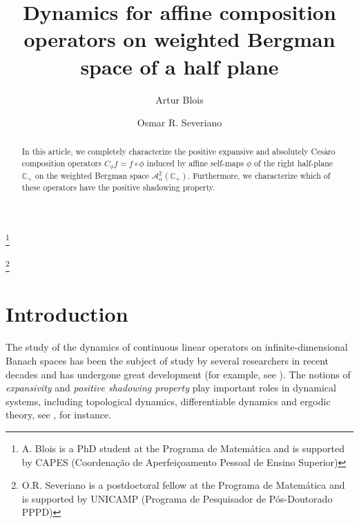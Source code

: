 \documentclass[11pt]{amsart}%
\numberwithin{equation}{section}
\theoremstyle{plain}
\theoremstyle{definition}
\theoremstyle{definition}
\newcommand{\hb}{\mathbb{C}_+}
\newcommand{\Ber}{\mathcal{A}^2_{\alpha}(\hb)}
\begin{document}
\title[]{Dynamics for affine composition operators on weighted Bergman space of a half plane}
	
\author{}

\address{}  
\email{}

\author{Artur Blois}
\address{IMECC, Universidade Estadual de Campinas, Campinas, Brazil}
\thanks{A. Blois is a PhD student at the Programa de Matemática and is supported by CAPES (Coordenação de Aperfeiçoamento Pessoal de Ensino Superior)}
    
\author{ Osmar R. Severiano}%
\address{ IMECC, Universidade Estadual de Campinas, Campinas, Brazil}
\thanks{ O.R. Severiano is a postdoctoral fellow at the Programa de Matemática and is supported by UNICAMP (Programa de Pesquisador de Pós-Doutorado PPPD) }
	
	
	
	
	
	
	
	
	
	
	
	
	
	
	
\keywords{}
	
	
	
\begin{abstract}
In this article, we completely characterize the positive expansive and absolutely Cesàro composition operators $C_{\phi}f=f\circ \phi$ induced by affine self-maps $\phi$ of the right half-plane $\mathbb{C}_+$ on the weighted Bergman space $\Ber$. Furthermore, we characterize which of these operators have the positive shadowing property.
\end{abstract}
	
\maketitle
	
	
	
\section{Introduction}
The study of the dynamics of continuous linear operators on infinite-dimensional Banach spaces has been the subject of study by several researchers in recent decades and has undergone great development (for example, see  \cite{Frederic, Grivaux, Grosse}). The notions of \textit{expansivity} and \textit{positive shadowing property} play important roles in dynamical systems, including topological dynamics, differentiable dynamics and ergodic theory, see \cite{Pilyugin, Pilyugin1}, for instance.
\end{document}
